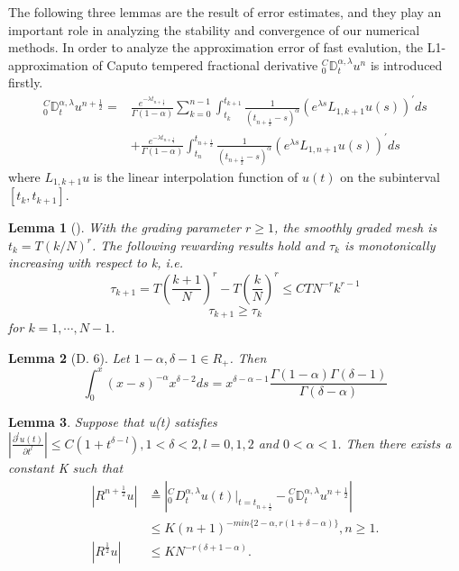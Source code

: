 \documentclass[10pt, reqno]{amsart}
\newtheorem{lmm}{\bf Lemma}
\newenvironment{lemma}{\begin{lmm}}{\end{lmm}}
\theoremstyle{remark}
\theoremstyle{definition}
\numberwithin{table}{section}
\begin{document}
The following three lemmas are the result of error estimates,  and they play an important role in analyzing the stability and convergence of our numerical methods.  In order to analyze the approximation error of fast evalution,  the L1-approximation of Caputo tempered fractional derivative $_0^C\mathbb{D}_t^{\alpha, \lambda} u^n$ is introduced firstly. 
\begin{equation}
\begin{aligned}
    _0^C\mathbb{D}_t^{\alpha, \lambda} u^{n+\frac{1}{2}}=&\frac{e^{-\lambda t_{n+\frac{1}{2}}}}{\Gamma(1-\alpha)}\sum_{k=0}^{n-1}\int_{t_k}^{t_{k+1}}\frac1{(t_{n+\frac{1}{2}}-s)^\alpha}\left(e^{\lambda s}L_{1, k+1}u(s)\right)^{\prime}ds\\
    &+\frac{e^{-\lambda t_{n+\frac{1}{2}}}}{\Gamma(1-\alpha)}\int_{t_n}^{t_{n+\frac{1}{2}}}\frac1{(t_{n+\frac{1}{2}}-s)^\alpha}\left(e^{\lambda s}L_{1, n+1}u(s)\right)^{\prime}ds
\end{aligned}
\end{equation}
where $L_{1, k+1}u$ is the linear interpolation function of $u(t)$ on the subinterval $\left[t_k, t_{k+1}\right]$. 
\begin{lemma}[\cite{cao2020}]\label{tau}
With the grading parameter $r \geq 1$,  the smoothly graded mesh is $t_k=T(k/N)^r$.  The following rewarding results hold and $\tau_k$ is monotonically increasing with respect to k,  i.e. 
$$\tau_{k+1}=T\left(\frac{k+1}N\right)^r-T\left(\frac kN\right)^r\leq C TN^{-r}k^{r-1}$$
$$\tau_{k+1}\geq \tau_k$$
for $k = 1, \cdots, N-1$. 
\end{lemma}
\begin{lemma}[\cite{diethelm2010}D. 6]\label{Gamma}Let $1-\alpha, \delta-1 \in R_+$. Then
    $$
\int_0^x (x-s)^{-\alpha}x^{\delta-2} ds=x^{\delta-\alpha-1} \frac{\Gamma(1-\alpha) \Gamma(\delta-1)}{\Gamma(\delta-\alpha)}
$$
\end{lemma}
\begin{lemma} \label{Ru}
Suppose that u(t) satisfies $\left|\frac{\partial^l u(t)}{\partial t^l}\right| \leq C(1+t^{\delta-l}),  1<\delta<2,  l=0, 1, 2$ and $0< \alpha < 1$.  Then there exists a constant K such that
\begin{equation}
    \begin{aligned}
        \left| R^{n+\frac{1}{2}}u\right|&\triangleq{}\left|{}^C_0D^{\alpha, \lambda}_tu(t)|_{t=t_{n+\frac{1}{2}}}- {}^C_0\mathbb{D}_t^{\alpha,  \lambda} u^{n+\frac{1}{2}}\right|\\
        &\leq K(n+1)^{-min\{2-\alpha, r(1+\delta-\alpha)\}},  n\geq 1. \\
|R^{\frac{1}{2}}u|&\leq KN^{-r(\delta+1-\alpha)}. \label{L1half}
\end{aligned}
\end{equation}
\end{lemma}
\end{document}

